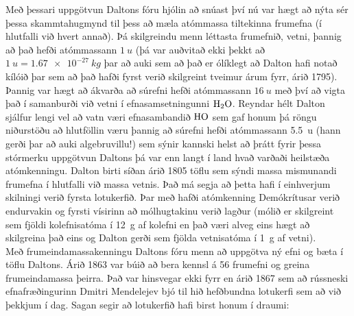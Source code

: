 \ifdefined \wholebook \else\documentclass[oneside]{book}\usepackage{EdlBook}\graphicspath{{figures/}}
\begin{document}
Með þessari uppgötvun Daltons fóru hjólin að snúast því nú var hægt að nýta sér þessa skammtahugmynd til þess að mæla atómmassa tiltekinna frumefna (í hlutfalli við hvert annað). Þá skilgreindu menn léttasta frumefnið, vetni, þannig að það hefði atómmassann $\SI{1}{u}$ (þá var auðvitað ekki þekkt að $\SI{1}{u} = \SI{1.67e-27}{kg}$ þar að auki sem að það er ólíklegt að Dalton hafi notað kílóið þar sem að það hafði fyrst verið skilgreint tveimur árum fyrr, árið 1795). Þannig var hægt að ákvarða að súrefni hefði atómmassann $\SI{16}{u}$ með því að vigta það í samanburði við vetni í efnasamsetningunni $\ce{H2O}$. Reyndar hélt Dalton sjálfur lengi vel að vatn væri efnasambandið $\ce{HO}$ sem gaf honum þá röngu niðurstöðu að hlutföllin væru þannig að súrefni hefði atómmassann \SI{5.5}{u} (hann gerði þar að auki algebruvillu!) sem sýnir kannski helst að þrátt fyrir þessa stórmerku uppgötvun Daltons þá var enn langt í land hvað varðaði heilstæða atómkenningu. Dalton birti síðan árið 1805 töflu sem sýndi massa mismunandi frumefna í hlutfalli við massa vetnis. Það má segja að þetta hafi í einhverjum skilningi verið fyrsta lotukerfið. Þar með hafði atómkenning Demókrítusar verið endurvakin og fyrsti vísirinn að mólhugtakinu verið lagður (mólið er skilgreint sem fjöldi kolefnisatóma í \SI{12}{g} af kolefni en það væri alveg eins hægt að skilgreina það eins og Dalton gerði sem fjölda vetnisatóma í \SI{1}{g} af vetni).  \\

Með frumeindamassakenningu Daltons fóru menn að uppgötva ný efni og bæta í töflu Daltons. Árið 1863 var búið að bera kennsl á 56 frumefni og greina frumeindamassa þeirra. Það var hinsvegar ekki fyrr en árið 1867 sem að rússneski efnafræðingurinn Dmitri Mendelejev bjó til hið hefðbundna lotukerfi sem að við þekkjum í dag. Sagan segir að lotukerfið hafi birst honum í draumi: \\

\begin{tcolorbox}

 \\

\vspace{-0.3cm}
\end{tcolorbox}

\end{document}
